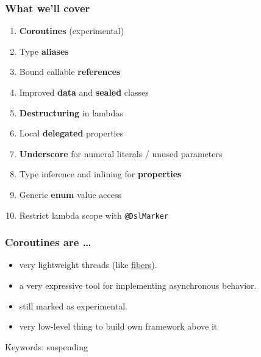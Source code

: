 


\begin{frame}\frametitle{What we'll cover}
  \begin{enumerate}[<+->]
  	\item \textbf{Coroutines} (experimental)
	\item Type \textbf{aliases}
	\item Bound callable \textbf{references}
	\item Improved \textbf{data} and \textbf{sealed} classes
	\item \textbf{Destructuring} in lambdas
	\item Local \textbf{delegated} properties
	\item \textbf{Underscore} for numeral literals / unused parameters %
	\item Type inference and inlining for \textbf{properties} %
	\item Generic \textbf{enum} value access
	\item Restrict lambda scope with \texttt{@DslMarker}
  \end{enumerate}
\end{frame}




\begin{frame}[fragile] \frametitle{Coroutines are \ldots}
\begin{itemize}
	\item very lightweight threads (like \href{https://en.wikipedia.org/wiki/Fiber_(computer_science)}{fibers}).
	\item a very expressive tool for implementing asynchronous behavior. %
	\item still marked as experimental.
	\item very low-level thing to build own framework above it
\end{itemize}
Keywords: suspending
\end{frame}

